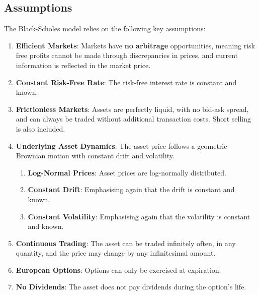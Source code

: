 \documentclass[12pt]{article}
\theoremstyle{definition}
\theoremstyle{remark}
\begin{document}
\subsection{Assumptions}
The Black-Scholes model relies on the following key assumptions:
\begin{enumerate}
	\item {\textbf{Efficient Markets}}: Markets have {\textbf{no arbitrage}} opportunities, meaning risk free profits cannot be made through discrepancies in prices, and current information is reflected in the market price.
	\item {\textbf{Constant Risk-Free Rate}}: The risk-free interest rate is constant and known.
	\item {\textbf{Frictionless Markets}}: Assets are perfectly liquid, with no bid-ask spread, and can always be traded without additional transaction costs. Short selling is also included.
	\item {\textbf{Underlying Asset Dynamics}}: The asset price follows a geometric Brownian motion with constant drift and volatility.
	\begin{enumerate}
		\item {\textbf{Log-Normal Prices}}: Asset prices are log-normally distributed.
		\item {\textbf{Constant Drift}}: Emphasising again that the drift is constant and known.
		\item {\textbf{Constant Volatility}}: Emphasising again that the volatility is constant and known.
	\end{enumerate}
	\item {\textbf{Continuous Trading}}: The asset can be traded infinitely often, in any quantity, and the price may change by any infinitesimal amount.
	\item {\textbf{European Options}}: Options can only be exercised at expiration.
	\item {\textbf{No Dividends}}: The asset does not pay dividends during the option's life.
\end{enumerate}

%
%
\end{document}
